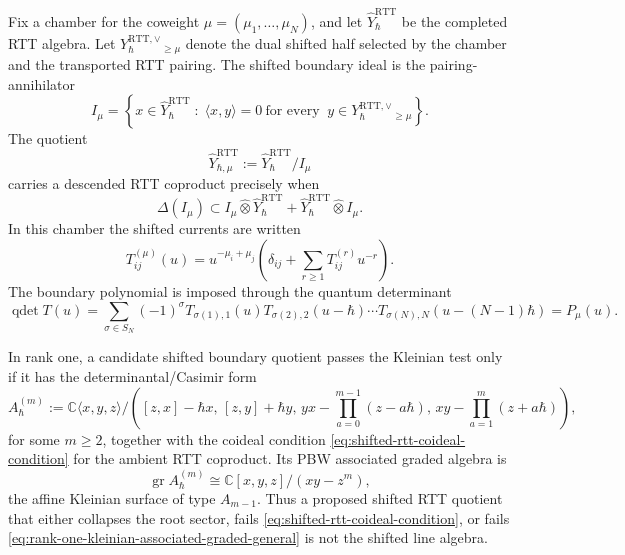 \begin{theorem}
\label{thm:shifted-rtt-pairing-annihilator-kleinian-test}
Fix a chamber for the coweight
\(\mu=(\mu_1,\dots,\mu_N)\), and let
\(\widehat Y_{\hbar}^{\mathrm{RTT}}\) be the completed RTT algebra.
Let \(Y_{\hbar}^{\mathrm{RTT},\vee}_{\ge\mu}\) denote the dual shifted
half selected by the chamber and the transported RTT pairing. The shifted
boundary ideal is the pairing-annihilator
\begin{equation}
\label{eq:shifted-rtt-pairing-annihilator}
I_\mu
=
\left\{
x\in \widehat Y_{\hbar}^{\mathrm{RTT}}
\;:\;
\langle x,y\rangle=0
\ \text{for every }\
y\in Y_{\hbar}^{\mathrm{RTT},\vee}_{\ge\mu}
\right\}.
\end{equation}
The quotient
\[
\widehat Y_{\hbar,\mu}^{\mathrm{RTT}}
:=
\widehat Y_{\hbar}^{\mathrm{RTT}}/I_\mu
\]
carries a descended RTT coproduct precisely when
\begin{equation}
\label{eq:shifted-rtt-coideal-condition}
\Delta(I_\mu)
\subset
I_\mu\widehat\otimes \widehat Y_{\hbar}^{\mathrm{RTT}}
+
\widehat Y_{\hbar}^{\mathrm{RTT}}\widehat\otimes I_\mu .
\end{equation}
In this chamber the shifted currents are written
\begin{equation}
\label{eq:shifted-rtt-local-generators}
T_{ij}^{(\mu)}(u)
=
u^{-\mu_i+\mu_j}
\left(
\delta_{ij}+\sum_{r\ge1}T_{ij}^{(r)}u^{-r}
\right).
\end{equation}
The boundary polynomial is imposed through the quantum determinant
\begin{equation}
\label{eq:shifted-rtt-qdet-polynomial}
\operatorname{qdet}T(u)
=
\sum_{\sigma\in S_N}(-1)^\sigma
T_{\sigma(1),1}(u)
T_{\sigma(2),2}(u-\hbar)
\cdots
T_{\sigma(N),N}(u-(N-1)\hbar)
=P_\mu(u).
\end{equation}

In rank one, a candidate shifted boundary quotient passes the Kleinian
test only if it has the determinantal/Casimir form
\begin{equation}
\label{eq:rank-one-quantized-kleinian-boundary}
A_{\hbar}^{(m)}
:=
\mathbb C\langle x,y,z\rangle
\Big/
\left(
[z,x]-\hbar x,\,
[z,y]+\hbar y,\,
yx-\prod_{a=0}^{m-1}(z-a\hbar),\,
xy-\prod_{a=1}^{m}(z+a\hbar)
\right),
\end{equation}
for some \(m\ge2\), together with the coideal condition
\eqref{eq:shifted-rtt-coideal-condition} for the ambient RTT coproduct.
Its PBW associated graded algebra is
\begin{equation}
\label{eq:rank-one-kleinian-associated-graded-general}
\operatorname{gr}A_{\hbar}^{(m)}
\cong
\mathbb C[x,y,z]/(xy-z^m),
\end{equation}
the affine Kleinian surface of type \(A_{m-1}\). Thus a proposed shifted
RTT quotient that either collapses the root sector, fails
\eqref{eq:shifted-rtt-coideal-condition}, or fails
\eqref{eq:rank-one-kleinian-associated-graded-general} is not the
shifted line algebra.
\end{theorem}

